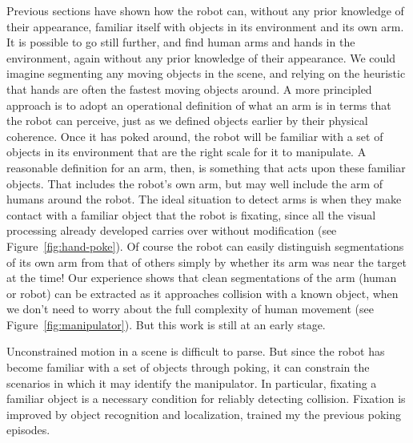 Previous sections have shown how the robot can, without any prior
knowledge of their appearance, familiar\ize{} itself with objects in its
environment and its own arm.  It is possible to go still further, and
find human arms and hands in the environment, again without any prior
knowledge of their appearance.  We could imagine segmenting any moving
objects in the scene, and relying on the heuristic that hands are
often the fastest moving objects around.  A more principled approach
is to adopt an operational definition of what an arm is in terms that
the robot can perceive, just as we defined objects earlier by their
physical coherence.  Once it has poked around, the robot will be
familiar with a set of objects in its environment that are the right
scale for it to manipulate.  A reasonable definition for an arm, then,
is something that acts upon these familiar objects.  That includes the
robot's own arm, but may well include the arm of humans around the
robot. The ideal situation to detect arms is when they make contact
with a familiar object that the robot is fixating, since all the
visual processing already developed carries over without modification
(see Figure~\ref{fig:hand-poke}).  Of course the robot can easily
distinguish segmentations of its own arm from that of others simply by
whether its arm was near the target at the time!  Our experience shows
that clean segmentations of the arm (human or robot) can be extracted
as it approaches collision with a known object, when we don't need to
worry about the full complexity of human movement (see
Figure~\ref{fig:manipulator}).  But this work is still at an early stage.


\ifverbose

Unconstrained motion in a scene is difficult to parse.  But since the
robot has become familiar with a set of objects through poking, it can
constrain the scenarios in which it may identify the manipulator.  In
particular, fixating a familiar object is a necessary condition for
reliably detecting collision.  Fixation is improved by object recognition
and localization, trained my the previous poking episodes.

